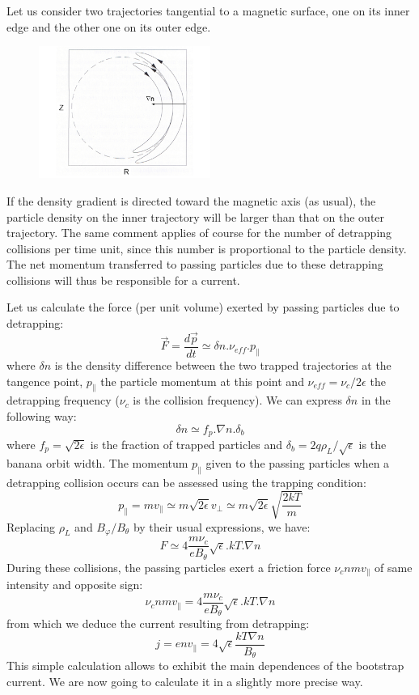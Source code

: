 Let us consider two trajectories tangential to a magnetic surface, one on its inner edge and the other one on its outer edge.

\begin{figure}[htbp]
	\centering
		\includegraphics[width=0.50\textwidth]{Fig_bootstrap_1.png}
	\label{fig:bootstrap}
\end{figure}
If the density gradient is directed toward the magnetic axis (as usual), the particle density on the inner trajectory will be larger than that on the outer trajectory. The same comment applies of course for the number of detrapping collisions per time unit, since this number is proportional to the particle density. The net momentum transferred to passing particles due to these detrapping collisions will thus be responsible for a current.

Let us calculate the force (per unit volume) exerted by passing particles due to detrapping:
\[
		\vec{F} = \frac{d\vec{p}}{dt} \simeq \delta n.\nu_{eff}.p_\|
\]
where $\delta n$ is the density difference between the two trapped trajectories at the tangence point, $p_\|$ the particle momentum at this point and $\nu_{eff} = \nu_c/2\epsilon$ the detrapping frequency ($\nu_c$  is the collision frequency). We can express $\delta n$ in the following way:
\[
		\delta n \simeq f_p.\nabla n.\delta_b
\]
where $f_p = \sqrt{2\epsilon}$ is the fraction of trapped particles and $\delta_b = 2q\rho_L/\sqrt{\epsilon}$ is the banana orbit width. The momentum $p_\|$ given to the passing particles when a detrapping collision occurs can be assessed using the trapping condition:
\[
		p_\| = mv_\| \simeq m\sqrt{2\epsilon}v_\perp \simeq m\sqrt{2\epsilon}\sqrt{\frac{2kT}{m}}
\]
Replacing $\rho_L$ and $B_\varphi/B_\theta$ by their usual expressions, we have:
\[
		F \simeq 4\frac{m\nu_c}{eB_\theta}\sqrt{\epsilon}.kT.\nabla n
\]
During these collisions, the passing particles exert a friction force $\nu_c nmv_\|$ of same intensity and opposite sign:
\[
		\nu_c nmv_\| = 4\frac{m\nu_c}{eB_\theta}\sqrt{\epsilon}.kT.\nabla n
\]
from which we deduce the current resulting from detrapping:
\[
		j = env_\| = 4\sqrt{\epsilon} \frac{kT\nabla n}{B_\theta}
\]
This simple calculation allows to exhibit the main dependences of the bootstrap current. We are now going to calculate it in a slightly more precise way.



